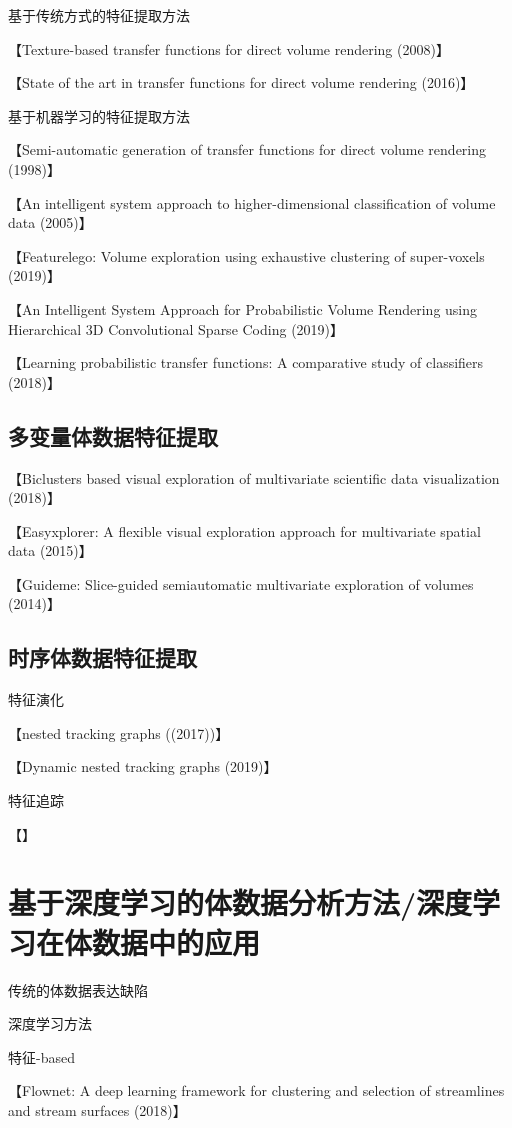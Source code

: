 基于传统方式的特征提取方法

【Texture-based transfer functions for direct volume rendering (2008)】

【State of the art in transfer functions for direct volume rendering (2016)】

基于机器学习的特征提取方法

【Semi-automatic generation of transfer functions for direct volume rendering (1998)】

【An intelligent system approach to higher-dimensional classification of volume data (2005)】

【Featurelego: Volume exploration using exhaustive clustering of super-voxels (2019)】

【An Intelligent System Approach for Probabilistic Volume Rendering using Hierarchical 3D Convolutional Sparse Coding (2019)】

【Learning probabilistic transfer functions: A comparative study of classifiers (2018)】

\subsection{多变量体数据特征提取}
【Biclusters based visual exploration of multivariate scientific data visualization (2018)】

【Easyxplorer: A flexible visual exploration approach for multivariate spatial data (2015)】

【Guideme: Slice-guided semiautomatic multivariate exploration of volumes (2014)】

\subsection{时序体数据特征提取}
特征演化

【nested tracking graphs ((2017))】

【Dynamic nested tracking graphs (2019)】

特征追踪

【】


\section{基于深度学习的体数据分析方法/深度学习在体数据中的应用}
传统的体数据表达缺陷

深度学习方法

特征-based

【Flownet: A deep learning framework for clustering and selection of streamlines and stream surfaces (2018)】

